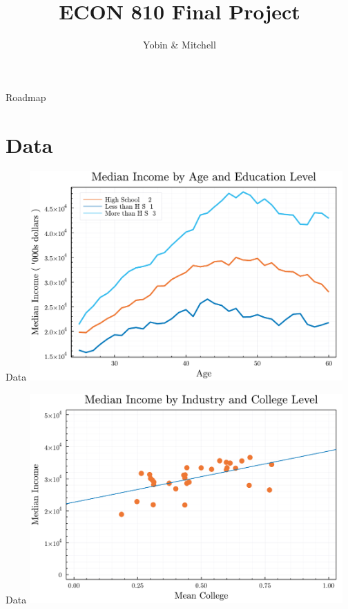 \documentclass[notes, 10pt]{beamer}
\title{ECON 810 Final Project}
\date{\displaydate{duedate}}
\author{Yobin  \& Mitchell}
\begin{document}
	\begin{frame}
		\maketitle
	\end{frame}

	\begin{frame}{Roadmap}
		\tableofcontents
	\end{frame}
	
	\section{Data}
	\begin{frame}{Data}
        \centering
        \includegraphics[width=12cm]{Figures/fig_median_income_by_age_and_education.pdf}
	\end{frame}
	\begin{frame}{Data}
        \centering
        \includegraphics[width=12cm]{Figures/relation_median_wage_hs_percent.pdf}
	\end{frame}
	
\end{document}
